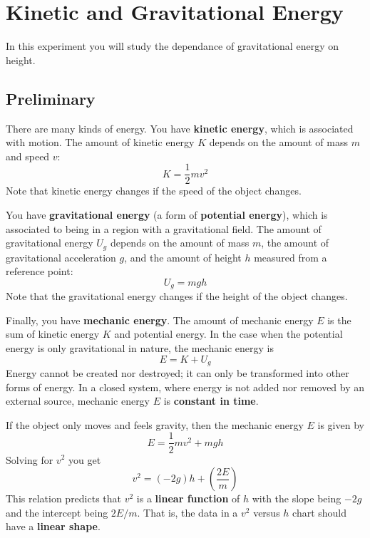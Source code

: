 \setcounter{chapter}{7}
\chapter{Kinetic and Gravitational Energy}
In this experiment you will study the dependance of gravitational energy on height.
\section{Preliminary}
There are many kinds of energy. You have \textbf{kinetic energy}, which is associated with motion. The amount of kinetic energy $K$ depends on the amount of mass $m$ and speed $v$:
\begin{equation}
    K = \frac{1}{2} m v^{2}
\end{equation}
Note that kinetic energy changes if the speed of the object changes.

You have \textbf{gravitational energy} (a form of \textbf{potential energy}), which is associated to being in a region with a gravitational field. The amount of gravitational energy $U_{g}$ depends on the amount of mass $m$, the amount of gravitational acceleration $g$, and the amount of height $h$ measured from a reference point:
\begin{equation}
    U_{g} = m g h
\end{equation}
Note that the gravitational energy changes if the height of the object changes.

Finally, you have \textbf{mechanic energy}. The amount of mechanic energy $E$ is the sum of kinetic energy $K$ and potential energy. In the case when the potential energy is only gravitational in nature, the mechanic energy is
\begin{equation}
    E = K + U_{g}
\end{equation}
Energy cannot be created nor destroyed; it can only be transformed into other forms of energy. In a closed system, where energy is not added nor removed by an external source, mechanic energy $E$ is \textbf{constant in time}.

If the object only moves and feels gravity, then the mechanic energy $E$ is given by
\begin{equation}
    E = \frac{1}{2} m v^{2} + m g h
\end{equation}
Solving for $v^{2}$ you get
\begin{equation} \label{eq.07.vv}
    v^{2} = \left( - 2 g \right) h + \left( \frac{2 E}{m} \right)
\end{equation}
This relation predicts that $v^{2}$ is a \textbf{linear function} of $h$ with the slope being $-2g$ and the intercept being $2 E / m$. That is, the data in a $v^{2}$ versus $h$ chart should have a \textbf{linear shape}.
